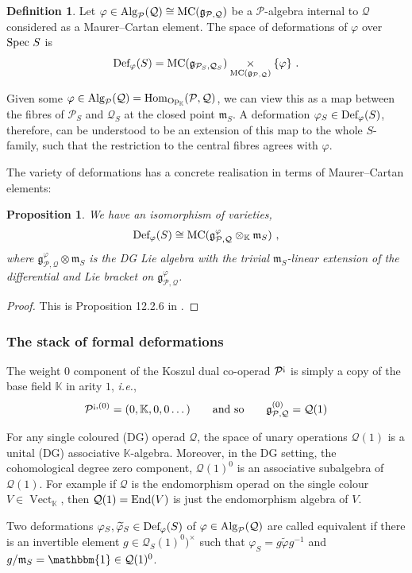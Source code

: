 \documentclass[11pt]{amsart}
\numberwithin{equation}{section}
\newtheorem{prop}[theo]{Proposition}
\theoremstyle{definition}
\newtheorem{defn}[theo]{Definition}
\newcommand{\bb}{\mathbb}
\newcommand{\mc}{\mathcal}
\newcommand{\mf}{\mathfrak}
\newcommand{\Def}{{\textup{Def}}}
\DeclareMathOperator{\Hom}{Hom}
\DeclareMathOperator{\Vect}{Vect}
\newcommand{\ik}{{\bb K}}
\newcommand{\End}{{\textup{End}}}
\newcommand{\Spec}{{\textup{Spec\ }}}
\newcommand{\Alg}{{\textup{Alg}}}
\newcommand{\ash}{{\textup{\mbox{!`}}}}
\newcommand{\Op}{{\textup{Op}}}
\newcommand{\MC}{{{\textup{MC}}}}
\newcommand{\0}{{\textbf{0}}}
\newcommand{\id}{{\textup{id}}}
\newcommand{\g}{{\mf{g}}}
\def\PP{{\mc P}}
\def\QQ{{\mc Q}}
\def\gf{\mathfrak{g}}
\def \mf{\mathfrak}
\def \id{\mathbbm{1}}
\def \Op{\mathrm{Op}}
\def \ie{{\it i.e.}}
\newcommand{\fibre}[1]{\underset{#1}{\times}}
\begin{document}
\begin{defn}\label{Defdefn}
 Let $\varphi\in \Alg_{\mc P}(\mc Q)\cong \MC(\g_{\mc P,\mc Q})$ be a $\mc P$-algebra internal to $\mc Q$ considered as a Maurer--Cartan element. The space of deformations of $\varphi$ over $\Spec S$ is
 \[ 
 \Def_\varphi(S) = \MC(\g_{\mc P_S,\mc Q_S}) \fibre{\MC(\g_{\mc P, \mc Q})} \{\varphi\}  \ .
 \]
\end{defn}
Given some $\varphi\in \Alg_\PP(\QQ)=\Hom_{\Op_\ik}(\PP,\QQ)$, we can view this as a map between the fibres of $\PP_S$ and $\QQ_S$ at the closed point $\mf m_S$. A deformation $\varphi_S\in\Def_\varphi(S)$, therefore, can be understood to be an extension of this map to the whole $S$-family, such that the restriction to the central fibres agrees with $\varphi$.

The variety of deformations has a concrete realisation in terms of Maurer--Cartan elements:
\begin{prop}\label{DefMCprop} 
We have an isomorphism of varieties, 
\[
\Def_\varphi(S) \cong \MC( \g^\varphi_{\mc P, \mc Q}\otimes_{\bb K} \mf m_S) \ ,
\] 
where $\g^\varphi_{\PP,\QQ}\otimes \mf m_S$ is the DG Lie algebra with the trivial $\mf m_S$-linear extension of the differential and Lie bracket on $\g^\varphi_{\PP,\QQ}$.
\end{prop}
\begin{proof}
This is Proposition 12.2.6 in \cite{LV}.
\end{proof}

\subsubsection{The stack of formal deformations}

The weight $0$ component of the Koszul dual co-operad $\PP^\ash$ is simply a copy of the base field $\ik$ in arity $1$, \ie,
\[
\PP^{\ash,(0)} = (0,\ik,0,0\dots)  \qquad \text{and so} \qquad \gf_{\PP,\QQ}^{(0)} = \QQ(1)
\]

For any single coloured (DG) operad $\QQ$, the space of unary operations $\QQ(1)$ is a unital (DG) associative $\ik$-algebra. Moreover, in the DG setting, the cohomological degree zero component, $\QQ(1)^0$ is an associative subalgebra of $\QQ(1)$. For example if $\QQ $ is the endomorphism operad on the single colour $V\in \Vect_\ik$, then $\QQ(1) = \End(V)$ is just the endomorphism algebra of $V$. 

Two deformations $\varphi_S, \widetilde{\varphi}_S\in \Def_\varphi(S)$ of $\varphi\in \Alg_{\PP}(\QQ)$ are called equivalent if there is an invertible element $g\in \QQ_S(1)^0)^\times$ such that $\varphi_S = g\widetilde{\varphi}g^{-1}$ and $g/\mf m_S =\id \in \QQ(1)^0$.
\end{document}
